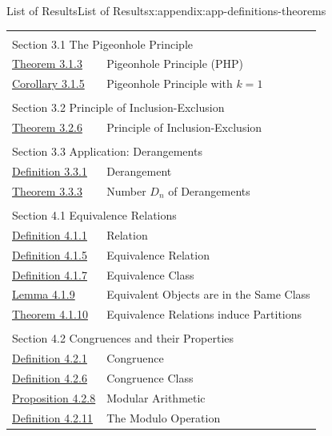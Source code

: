 \documentclass[oneside,10pt,]{book}
\numberwithin{equation}{section}
\begin{document}
\begin{appendixptx}{List of Results}{}{List of Results}{}{}{x:appendix:app-definitions-theorems}
\begin{longtable}[l]{ll}
\multicolumn{2}{l}{\null}\\[1.5ex] \multicolumn{2}{l}{\large Section 3.1 The Pigeonhole Principle}\\[0.5ex]
\hyperref[x:theorem:thm-php]{Theorem 3.1.3}& Pigeonhole Principle (PHP)\\
\hyperref[x:corollary:cor-php]{Corollary 3.1.5}& Pigeonhole Principle with \(k=1\)\\
\multicolumn{2}{l}{\null}\\[1.5ex] \multicolumn{2}{l}{\large Section 3.2 Principle of Inclusion-Exclusion}\\[0.5ex]
\hyperref[x:theorem:thm-pie]{Theorem 3.2.6}& Principle of Inclusion-Exclusion\\
\multicolumn{2}{l}{\null}\\[1.5ex] \multicolumn{2}{l}{\large Section 3.3 Application: Derangements}\\[0.5ex]
\hyperref[x:definition:def-derangement]{Definition 3.3.1}& Derangement\\
\hyperref[x:theorem:thm-derangement]{Theorem 3.3.3}& Number \(D_n\) of Derangements\\
\multicolumn{2}{l}{\null}\\[1.5ex] \multicolumn{2}{l}{\large Section 4.1 Equivalence Relations}\\[0.5ex]
\hyperref[x:definition:def-relation]{Definition 4.1.1}& Relation\\
\hyperref[x:definition:def-equivalence-relation]{Definition 4.1.5}& Equivalence Relation\\
\hyperref[x:definition:def-equivalence-class]{Definition 4.1.7}& Equivalence Class\\
\hyperref[x:lemma:lemma-equivalence-class]{Lemma 4.1.9}& Equivalent Objects are in the Same Class\\
\hyperref[x:theorem:thm-equivalence-partition]{Theorem 4.1.10}& Equivalence Relations induce Partitions\\
\multicolumn{2}{l}{\null}\\[1.5ex] \multicolumn{2}{l}{\large Section 4.2 Congruences and their Properties}\\[0.5ex]
\hyperref[x:definition:def-congruence]{Definition 4.2.1}& Congruence\\
\hyperref[x:definition:def-congruence-class]{Definition 4.2.6}& Congruence Class\\
\hyperref[x:proposition:prop-cong-modular-arithmetic]{Proposition 4.2.8}& Modular Arithmetic\\
\hyperref[x:definition:def-cong-modulo]{Definition 4.2.11}& The Modulo Operation\\

\end{longtable}
\end{appendixptx}
\end{document}

